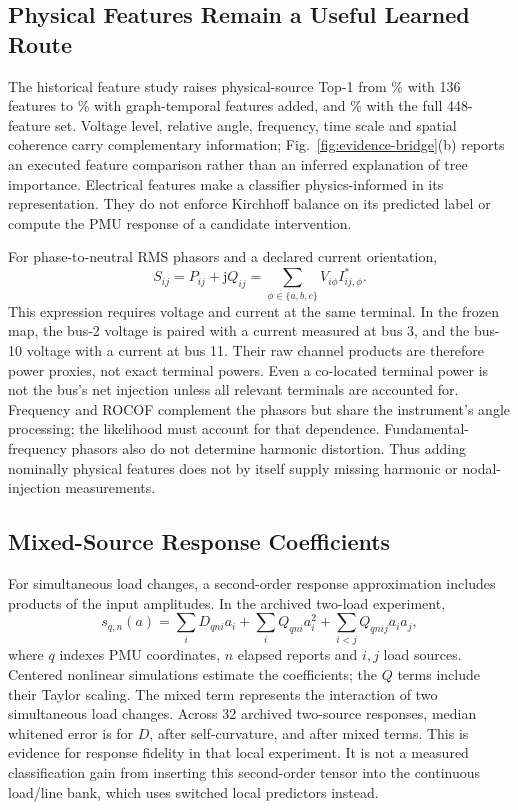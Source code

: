 \subsection{Physical Features Remain a Useful Learned Route}
The historical feature study raises physical-source Top-1 from
\BridgeBaseTop\% with 136 features to \BridgeGraphTop\% with graph-temporal
features added, and \BridgeFullTop\% with the full 448-feature set.
Voltage level, relative angle, frequency, time scale and spatial coherence
carry complementary information; Fig.~\ref{fig:evidence-bridge}(b) reports
an executed feature comparison rather than an inferred explanation of
tree importance. Electrical features make a classifier physics-informed
in its representation. They do not enforce Kirchhoff balance on its
predicted label or compute the PMU response of a candidate intervention.

For phase-to-neutral RMS phasors and a declared current orientation,
\begin{equation}
 S_{ij}=P_{ij}+\mathrm jQ_{ij}
       =\sum_{\phi\in\{a,b,c\}}V_{i\phi}I_{ij,\phi}^{*}.
 \label{eq:bridge-terminal-power}
\end{equation}
This expression requires voltage and current at the same terminal.
In the frozen map, the bus-2 voltage is paired with a current measured at
bus 3, and the bus-10 voltage with a current at bus 11. Their raw channel
products are therefore power proxies, not exact terminal powers. Even a
co-located terminal power is not the bus's net injection unless all
relevant terminals are accounted for. Frequency and ROCOF complement the phasors
but share the instrument's angle processing; the likelihood must account
for that dependence. Fundamental-frequency phasors also do not determine
harmonic distortion. Thus adding nominally physical features does not
by itself supply missing harmonic or nodal-injection measurements.

\subsection{Mixed-Source Response Coefficients}
For simultaneous load changes, a second-order response approximation
includes products of the input amplitudes. In the archived two-load
experiment,
\begin{equation}
 s_{q,n}(a)=\sum_i D_{qni}a_i+\sum_i Q_{qni}a_i^2
               +\sum_{i<j}Q_{qnij}a_ia_j,
 \label{eq:bridge-response-tensor}
\end{equation}
where $q$ indexes PMU coordinates, $n$ elapsed reports and $i,j$ load
sources. Centered nonlinear simulations estimate the coefficients; the
$Q$ terms include their Taylor scaling. The mixed term represents the
interaction of two simultaneous load changes. Across 32 archived
two-source responses, median whitened error is \BridgeDError{} for $D$,
\BridgeQError{} after self-curvature, and \BridgeMixedError{} after mixed
terms. This is evidence for response fidelity in that local experiment.
It is not a measured classification gain from inserting this second-order
tensor into the continuous load/line bank, which uses switched local
predictors instead.

